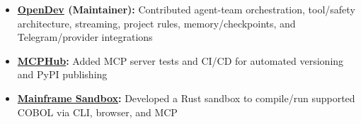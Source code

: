 \begin{itemize}[itemsep=0pt,topsep=0.5pt]
    \item \textbf{\href{https://github.com/opendev-to/opendev}{OpenDev} (Maintainer):} Contributed agent-team orchestration, tool/safety architecture, streaming, project rules, memory/checkpoints, and Telegram/provider integrations
    \item \textbf{\href{https://github.com/Cognitive-Stack/mcphub}{MCPHub}:} Added MCP server tests and CI/CD for automated versioning and PyPI publishing
    \item \textbf{\href{https://github.com/toreleon/mainframe-env}{Mainframe Sandbox}:} Developed a Rust sandbox to compile/run supported COBOL via CLI, browser, and MCP
\end{itemize}
